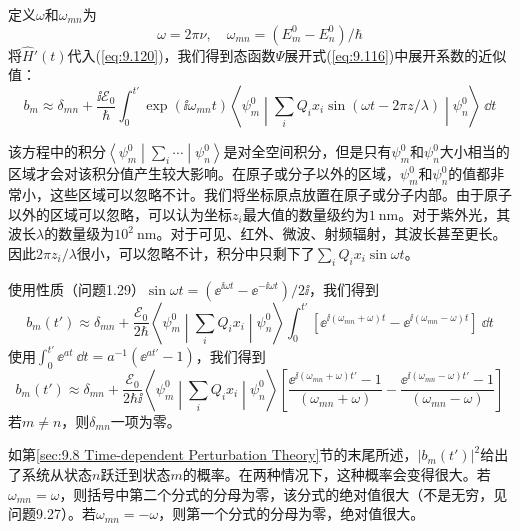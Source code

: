     定义$\omega$和$\omega_{mn}$为
    \begin{equation}
        \omega = 2\pi\nu, \quad \omega_{mn} = \left(E_m^0 - E_n^0\right)/\hbar
        \label{eq:9.122}
    \end{equation}
    将$\hat{H}'\left(t\right)$代入(\ref{eq:9.120})，我们得到态函数$\Psi$展开式(\ref{eq:9.116})中展开系数的近似值：
    \begin{equation*}
        b_m \approx \delta_{mn} + \frac{\ii \mathscr{E}_0}{\hbar}\int_{0}^{t'} \exp\left(\ii \omega_{mn}t\right)\left\langle \psi_m^0 \middle| \sum_i Q_i x_i \sin\left(\omega t - 2\pi z/\lambda\right) \middle| \psi_n^0 \right\rangle \:\dd t
    \end{equation*}

    该方程中的积分$\left\langle \psi_m^0 \middle| \sum_i\cdots \middle| \psi_n^0 \right\rangle$是对全空间积分，但是只有$\psi_m^0$和$\psi_n^0$大小相当的区域才会对该积分值产生较大影响。在原子或分子以外的区域，$\psi_m^0$和$\psi_n^0$的值都非常小，这些区域可以忽略不计。我们将坐标原点放置在原子或分子内部。由于原子以外的区域可以忽略，可以认为坐标$z_i$最大值的数量级约为$1\:\mathrm{nm}$。对于紫外光，其波长$\lambda$的数量级为$10^2\:\mathrm{nm}$。对于可见、红外、微波、射频辐射，其波长甚至更长。因此$2\pi z_i/\lambda$很小，可以忽略不计，积分中只剩下了$\sum_i Q_i x_i \sin \omega t$。

    使用性质（问题1.29）$\sin \omega t = \left(\ee ^{\ii \omega t} - \ee ^{-\ii \omega t}\right)/2\ii $，我们得到
    \begin{equation*}
        b_m\left(t'\right) \approx \delta_{mn} + \frac{\mathscr{E}_0}{2\hbar}\left\langle \psi_m^0 \middle| \sum_i Q_i x_i \middle| \psi_n^0 \right\rangle \int_{0}^{t'} \left[\ee ^{\ii \left(\omega_{mn}+\omega\right)t} - \ee ^{\ii \left(\omega_{mn}-\omega\right)t}\right]\:\dd t
    \end{equation*}
    使用$\int_{0}^{t'} \ee ^{at}\:\dd t = a^{-1}\left(\ee ^{at'} - 1\right)$，我们得到
    \begin{equation}
        b_m\left(t'\right) \approx \delta_{mn} + \frac{\mathscr{E}_0}{2\hbar\ii }\left\langle \psi_m^0 \middle| \sum_i Q_i x_i \middle| \psi_n^0 \right\rangle \left[\frac{\ee ^{\ii \left(\omega_{mn}+\omega\right)t'} - 1}{\left(\omega_{mn}+\omega\right)} - \frac{\ee ^{\ii \left(\omega_{mn}-\omega\right)t'} - 1}{\left(\omega_{mn}-\omega\right)}\right]
        \label{eq:9.123}
    \end{equation}
    若$m \neq n$，则$\delta_{mn}$一项为零。

    如第\ref{sec:9.8 Time-dependent Perturbation Theory}节的末尾所述，$\left|b_m\left(t'\right)\right|^2$给出了系统从状态$n$跃迁到状态$m$的概率。在两种情况下，这种概率会变得很大。若$\omega_{mn} = \omega$，则括号中第二个分式的分母为零，该分式的绝对值很大（不是无穷，见问题9.27）。若$\omega_{mn} = -\omega$，则第一个分式的分母为零，绝对值很大。

